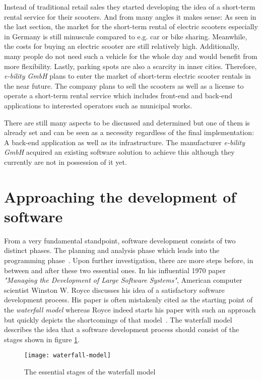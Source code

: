\documentclass[12pt,a4paper,twoside]{report}
\begin{document}
Instead of traditional retail sales they started developing the idea of a
short-term rental service for their scooters. And from many angles it makes sense:
As seen in the last section, the market for the short-term rental of electric scooters
especially in Germany is still minuscule compared to e.g. car or bike sharing.
Meanwhile, the costs for buying an electric scooter are still relatively high.
Additionally, many people do not need such a vehicle for the whole day and would benefit
from more flexibility. Lastly, parking spots are also a scarcity in inner cities.
Therefore, \textit{e-bility GmbH} plans to enter the market of short-term electric scooter rentals
in the near future. The company plans to sell the scooters as well as a license
to operate a short-term rental service which includes front-end and back-end applications
to interested operators such as municipal works.

There are still many aspects to be discussed and determined but one of them
is already set and can be seen as a necessity regardless of the final implementation:
A back-end application as well as its infrastructure.
The manufacturer \textit{e-bility GmbH} acquired an existing software solution
to achieve this although they currently are not in possession of it yet.


\section{Approaching the development of software} \label{sect:software-development-process}

From a very fundamental standpoint, software development consists of two distinct phases.
The planning and analysis phase which leads into the programming phase~\cite{royce-large-systems}.
Upon further investigation, there are more steps before, in between and after these two essential ones.
In his influential 1970 paper \textit{"Managing the Development of Large Software Systems"},
American computer scientist Winston W. Royce discusses his idea of a satisfactory
software development process. His paper is often mistakenly cited as the starting point
of the \textit{waterfall model} whereas Royce indeed starts his paper with such an approach but quickly
depicts the shortcomings of that model~\cite{royce-large-systems, larman-iid-history}.
The waterfall model describes the idea that a software development process should consist of
the stages shown in figure \ref{fig:waterfall-model}.

\begin{figure}[htbp]
\centering
\texttt{[image: waterfall-model]}
\caption{The essential stages of the waterfall model}
\label{fig:waterfall-model}
\end{figure}
\end{document}
